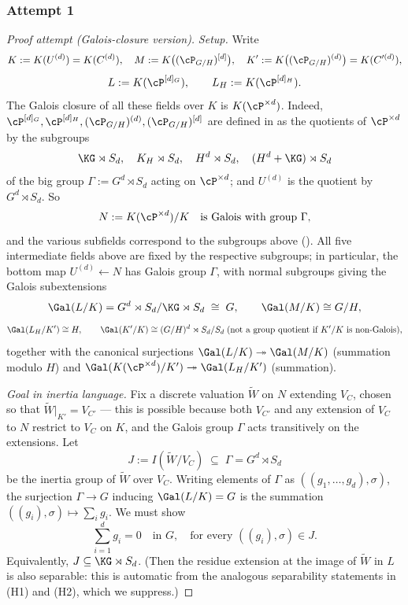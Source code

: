 \subsubsection{Attempt 1}
\begin{proof}[Proof attempt (Galois-closure version)]
\textit{Setup.}
Write
\[
K := K(U^{(d)}) = K(C^{(d)}),\quad
M := K\bigl((\cP_{G/H})^{[d]}\bigr),\quad
K' := K\bigl((\cP_{G/H})^{(d)}\bigr) = K(C'^{(d)}),
\]
\[
L := K(\cP^{[d]_G}),\qquad L_H := K(\cP^{[d]_H}).
\]
The Galois closure of all these fields over $K$ is $K(\cP^{\times d})$. Indeed,
$\cP^{[d]_G}, \cP^{[d]_H}, (\cP_{G/H})^{(d)}, (\cP_{G/H})^{[d]}$ are defined in
 as the quotients of $\cP^{\times d}$
by the subgroups
\[
\KG \rtimes S_d,\quad K_H \rtimes S_d,\quad H^d \rtimes S_d,\quad
(H^d + \KG) \rtimes S_d
\]
of the big group $\Gamma := G^d \rtimes S_d$ acting on $\cP^{\times d}$; and
$U^{(d)}$ is the quotient by $G^d \rtimes S_d$. So
\[
N := K(\cP^{\times d}) / K
\quad\text{is Galois with group } \Gamma,
\]
and the various subfields correspond to the subgroups above
(). All five intermediate fields above are
fixed by the respective subgroups; in particular, the bottom map
$U^{(d)}\!\leftarrow\!N$ has Galois group $\Gamma$, with normal subgroups giving
the Galois subextensions
\[
\Gal(L/K) = G^d \rtimes S_d / \KG \rtimes S_d \;\cong\; G,
\qquad
\Gal(M/K) \cong G/H,
\]
\[
\Gal(L_H/K') \cong H,\qquad \Gal(K'/K) \cong (G/H)^d \rtimes S_d / S_d
\;\text{(not a group quotient if $K'/K$ is non-Galois),}
\]
together with the canonical surjections
$\Gal(L/K)\twoheadrightarrow\Gal(M/K)$ (summation modulo $H$) and
$\Gal(K(\cP^{\times d})/K')\twoheadrightarrow\Gal(L_H/K')$ (summation).

\smallskip
\textit{Goal in inertia language.} Fix a discrete valuation $\widetilde{W}$ on
$N$ extending $V_C$, chosen so that $\widetilde{W}|_{K'} = V_{C'}$ — this is
possible because both $V_{C'}$ and any extension of $V_C$ to $N$ restrict to
$V_C$ on $K$, and the Galois group $\Gamma$ acts transitively on the extensions.
Let
\[
J := I(\widetilde{W}/V_C) \;\subseteq\; \Gamma = G^d \rtimes S_d
\]
be the inertia group of $\widetilde{W}$ over $V_C$. Writing elements of
$\Gamma$ as $((g_1,\dots,g_d),\sigma)$, the surjection
$\Gamma \to G$ inducing $\Gal(L/K) = G$ is the summation
$((g_i),\sigma) \mapsto \sum_i g_i$. We must show
\begin{equation}\label{eq:goal-inertia}
\sum_{i=1}^d g_i = 0 \quad\text{in } G,
\quad\text{for every } ((g_i),\sigma) \in J.
\end{equation}
Equivalently, $J \subseteq \KG \rtimes S_d$. (Then the residue extension at the
image of $\widetilde{W}$ in $L$ is also separable: this is automatic from the
analogous separability statements in (H1) and (H2), which we suppress.)


\end{proof}
